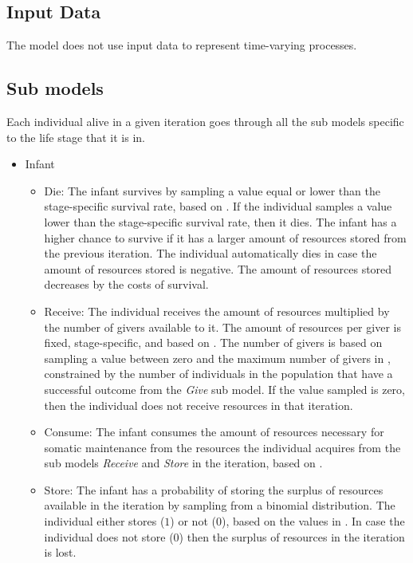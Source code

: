 \documentclass{article}
\begin{document}
\subsection{Input Data}

The model does not use input data to represent time-varying processes.

\subsection{Sub models}

Each individual alive in a given iteration goes through all the sub models specific to the life stage that it is in.

\begin{itemize}
    \item Infant
    \begin{itemize}
        \item Die: The infant survives by sampling a value equal or lower than the stage-specific survival rate, based on \cite{gurven2007longevity}. If the individual samples a value lower than the stage-specific survival rate, then it dies. The infant has a higher chance to survive if it has a larger amount of resources stored from the previous iteration. The individual automatically dies in case the amount of resources stored is negative. The amount of resources stored decreases by the costs of survival.
        \item Receive: The individual receives the amount of resources multiplied by the number of givers available to it. The amount of resources per giver is fixed, stage-specific, and based on \cite{gurven2004give}. The number of givers is based on sampling a value between zero and the maximum number of givers in \cite{gurven2004give}, constrained by the number of individuals in the population that have a successful outcome from the \emph{Give} sub model. If the value sampled is zero, then the individual does not receive resources in that iteration.
        \item Consume: The infant consumes the amount of resources necessary for somatic maintenance from the resources the individual acquires from the sub models \emph{Receive} and \emph{Store} in the iteration, based on \cite{kaplan2000theory, pontzer2021daily}.
        \item Store: The infant has a probability of storing the surplus of resources available in the iteration by sampling from a binomial distribution. The individual either stores ($1$) or not ($0$), based on the values in \citep{bowles2011cultivation}. In case the individual does not store ($0$) then the surplus  of resources in the iteration is lost.

\end{itemize}
\end{itemize}
\end{document}
